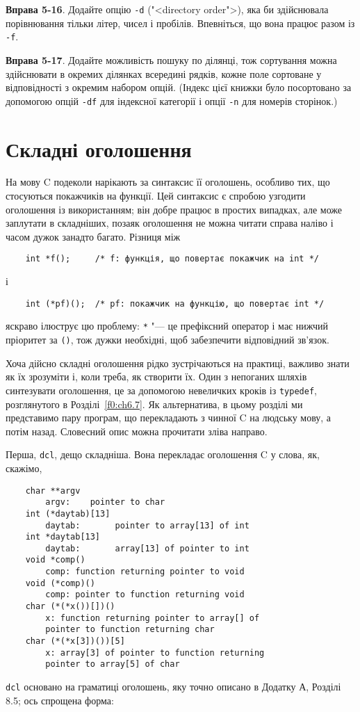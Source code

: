 \documentclass[a4paper,12pt]{book}
\begin{document}
  \textbf{Вправа 5-16}. Додайте опцію \texttt{-d} ("<directory order">), яка би
  здійснювала порівнювання тільки літер, чисел і пробілів. Впевніться, що вона працює
  разом із \texttt{-f}.

  \textbf{Вправа 5-17}. Додайте можливість пошуку по ділянці, тож сортування можна
  здійснювати в окремих ділянках всередині рядків, кожне поле сортоване у відповідності з
  окремим набором опцій. (Індекс цієї книжки було посортовано за допомогою опцій
  \texttt{-df} для індексної категорії і опції \texttt{-n} для номерів сторінок.)

\section{Складні оголошення}
\label{f0:ch5.12}

  На мову C подеколи нарікають за синтаксис її оголошень, особливо тих, що стосуються
  покажчиків на функції. Цей синтаксис є спробою узгодити оголошення із
  використанням; він добре працює в простих випадках, але може заплутати в складніших,
  позаяк оголошення не можна читати справа наліво і часом дужок занадто багато. Різниця
  між
  \begin{verbatim}
    int *f();     /* f: функція, що повертає покажчик на int */
  \end{verbatim}
  і
  \begin{verbatim}
    int (*pf)();  /* pf: покажчик на функцію, що повертає int */
  \end{verbatim}
  яскраво ілюструє цю проблему: \texttt{*} "--- це префіксний оператор і має нижчий
  пріоритет за \texttt{()}, тож дужки необхідні, щоб забезпечити відповідний зв'язок.
  
  Хоча дійсно складні оголошення рідко зустрічаються на практиці, важливо знати як їх
  зрозуміти і, коли треба, як створити їх. Один з непоганих шляхів синтезувати оголошення,
  це за допомогою невеличких кроків із \texttt{typedef}, розглянутого в
  Розділі~\ref{f0:ch6.7}. Як альтернатива, в цьому розділі ми представимо пару програм, що
  перекладають з чинної C на людську мову, а потім назад. Словесний опис можна прочитати
  зліва направо.

  Перша, \texttt{dcl}, дещо складніша. Вона перекладає оголошення C у слова, як, скажімо,
  \begin{verbatim}
    char **argv
        argv:    pointer to char
    int (*daytab)[13]
        daytab:       pointer to array[13] of int
    int *daytab[13]
        daytab:       array[13] of pointer to int
    void *comp()
        comp: function returning pointer to void
    void (*comp)()
        comp: pointer to function returning void
    char (*(*x())[])()
        x: function returning pointer to array[] of
        pointer to function returning char
    char (*(*x[3])())[5]
        x: array[3] of pointer to function returning
        pointer to array[5] of char
  \end{verbatim}
  \texttt{dcl} основано на граматиці оголошень, яку точно описано в Додатку А, Розділі
  8.5; ось спрощена форма:
 
\end{document}

